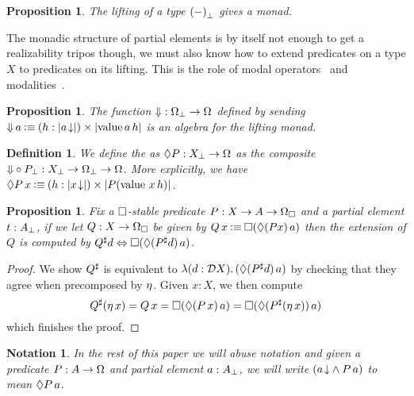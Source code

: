 \documentclass[11pt]{article}
\newtheorem{prop}[thrm]{Proposition}
\newtheorem{defn}[thrm]{Definition}
\newtheorem{nota}[thrm]{Notation}
\begin{document}
\begin{prop}
  The lifting of a type \({(-)}_\bot\) gives a monad.
\end{prop}

The monadic structure of partial elements is by itself not enough to get
a realizability tripos though, we must also know how to extend predicates on
a type \(X\) to predicates on its lifting.
%
This is the role of modal operators~\cite{moggiNotionsComputationMonads1991} and
modalities~\cite{cohenPartialMonadicCombinatory2025}.

\begin{prop}
  The function \({\Downarrow} : {\Omega}_\bot \to \Omega\) defined by
  sending
  \(
    {\Downarrow}\,{a} \mathbin{\vcentcolon\equiv} {(h:|{{{a}\!\downarrow}}|)}\times{|{\text{value}\,{a}\,h}|}
  \)
  is an algebra for the lifting monad.
\end{prop}

\begin{defn}
  We define the  as
  \(\Diamond{P} : {X}_\bot \to \Omega\) as the composite
  \({\Downarrow}\circ{P}_\bot : {X}_\bot \to {\Omega}_\bot \to \Omega\).
  More explicitly, we have
  \(\Diamond{P}\,x\mathbin{\vcentcolon\equiv} {(h:|{{{x}\!\downarrow}}|)}\times{|{P(\text{value}\,{\,}x\,h)}|}\).
\end{defn}

\begin{prop}\label{prop:boxed-partial-extension}
  Fix a \(\Box\)-stable predicate \(P : X \to A \to \Omega_\Box\)
  and a partial element \(t : {A}_\bot\),
  if we let \(Q:X \to \Omega_\Box\) be given by
  \(
    Q\,x \mathbin{\vcentcolon\equiv} \Box{(\Diamond{(Px)}\,a)}
  \)
  then the extension of \(Q\)
  is computed by
  \(
    {Q}^\sharp d \Leftrightarrow \Box{(\Diamond{({P}^\sharp d)}\,a)}
  \).
\end{prop}
\begin{proof}
  We show \({Q}^\sharp\) is equivalent to
  \({\mathop{\lambda({d:\mathcal{D}{X}}).}{(\Diamond{({P}^\sharp d)}\,a)}}\) by checking that they
  agree when precomposed by \(\eta\).
  Given \(x : X\), we then compute
  \[
    {Q}^\sharp(\eta\,{x})
    = Q\,x
    = \Box{(\Diamond{(P\,x)}\,a)}
    = \Box{(\Diamond{({P}^\sharp(\eta\,{x}))}\,a)}
  \]
  which finishes the proof.
\end{proof}

\begin{nota}
  In the rest of this paper we will abuse notation and given
  a predicate \(P : A \to \Omega\) and partial element \(a : {A}_\bot\),
  we will write
  \(({{{a}\!\downarrow}}\land{P\,a})\) to mean \(\Diamond{P}\,a\).
\end{nota}
\end{document}
